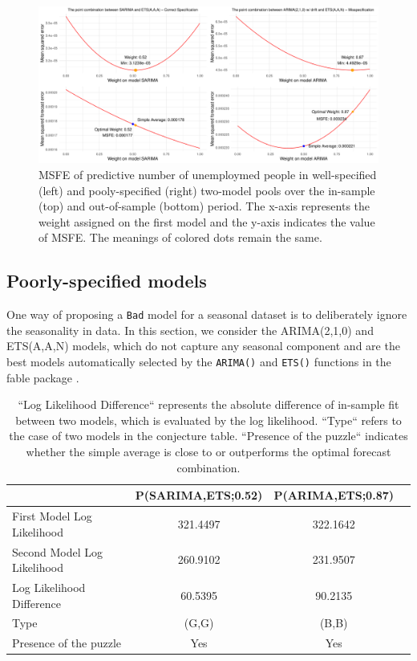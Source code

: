\documentclass{monashthesis}
\begin{document}
\begin{figure}[ht]
\centering
\includegraphics[scale=0.5]{figures/EMPL.pdf}
\caption{MSFE of predictive number of unemploymed people in well-specified (left) and pooly-specified (right) two-model pools over the in-sample (top) and out-of-sample (bottom) period. The x-axis represents the weight assigned on the first model and the y-axis indicates the value of MSFE. The meanings of colored dots remain the same.}
\label{fig:sd}
\end{figure}

\newpage

\subsection*{Poorly-specified models}

One way of proposing a \texttt{Bad} model for a seasonal dataset is to deliberately ignore the seasonality in data. In this section, we consider the ARIMA(2,1,0) and ETS(A,A,N) models, which do not capture any seasonal component and are the best models automatically selected by the \texttt{ARIMA()} and \texttt{ETS()} functions in the fable package \autocite{fpp23}.

\begin{table}[ht]
  \centering
    \begin{tabular}{l|ccc}
    \toprule
                                      &   P(SARIMA,ETS;0.52)   &   P(ARIMA,ETS;0.87)  \\  
    \midrule
    First Model Log Likelihood        &         321.4497       &      322.1642        \\
    Second Model Log Likelihood       &         260.9102       &      231.9507        \\
    Log Likelihood Difference         &         60.5395        &      90.2135         \\
    Type                              &          (G,G)         &       (B,B)          \\
    Presence of the puzzle            &           Yes          &        Yes           \\
    \bottomrule
    \end{tabular}
  \caption{``Log Likelihood Difference`` represents the absolute difference of in-sample fit between two models, which is evaluated by the log likelihood. ``Type`` refers to the case of two models in the conjecture table. ``Presence of the puzzle`` indicates whether the simple average is close to or outperforms the optimal forecast combination.}
  \label{tab:season}
\end{table}
\end{document}
